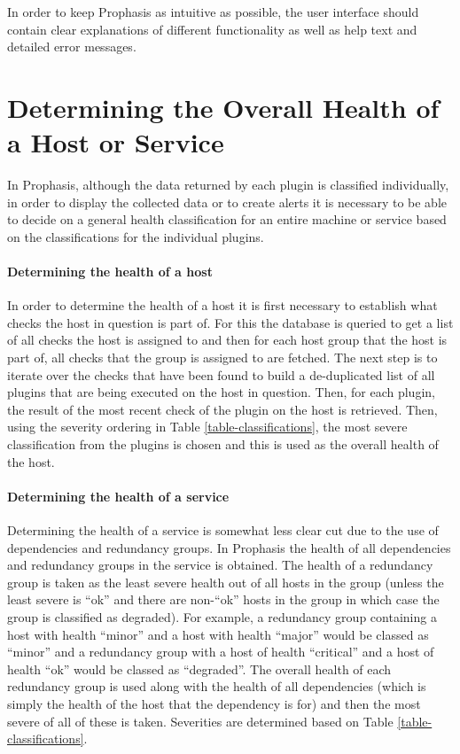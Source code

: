 \documentclass[bsc,logo,twoside,parskip,singlespacing,notimes]{infthesis}
\begin{document}
	In order to keep Prophasis as intuitive as possible, the user interface should
	contain clear explanations of different functionality as well as help text and
	detailed error messages.

\section{Determining the Overall Health of a Host or Service}

	In Prophasis, although the data returned by each plugin is classified individually,
	in order to display the collected data or to create alerts it is necessary to
	be able to decide on a general health classification for an entire machine or
	service based on the classifications for the individual plugins.

\paragraph*{Determining the health of a host}
	In order to determine the health of a host it is first necessary to establish what
	checks the host in question is part of. For this the database is queried to get
	a list of all checks the host is assigned to and then for each host group that
	the host is part of, all checks that the group is assigned to are fetched.  The next
	step is to iterate over the checks that have been found to build a de-duplicated list
	of all plugins that are being executed on the host in question. Then, for each
	plugin, the result of the most recent check of the plugin on the host is retrieved.
	Then, using the severity ordering in Table \ref{table-classifications}, the most
	severe classification from the plugins is chosen and this is used as the overall
	health of the host.

\paragraph*{Determining the health of a service}
	Determining the health of a service is somewhat less clear cut due to the use
	of dependencies and redundancy groups.  In Prophasis the health of all dependencies
	and redundancy groups in the service is obtained. The health of a redundancy group
	is taken as the least severe health out of all hosts in the group (unless the least
	severe is ``ok'' and there are non-``ok'' hosts in the group in
	which case the group is classified as degraded).  For example, a redundancy group
	containing a host with health ``minor'' and a host with health ``major'' would be
	classed as ``minor'' and a redundancy group with a host of health ``critical'' and
	a host of health ``ok'' would be classed as ``degraded''.  The overall
	health of each redundancy group is used along with the health of all dependencies
	(which is simply the health of the host that the dependency is for) and then
	the most severe of all of these is taken.  Severities are determined based on Table
	\ref{table-classifications}.
\end{document}
